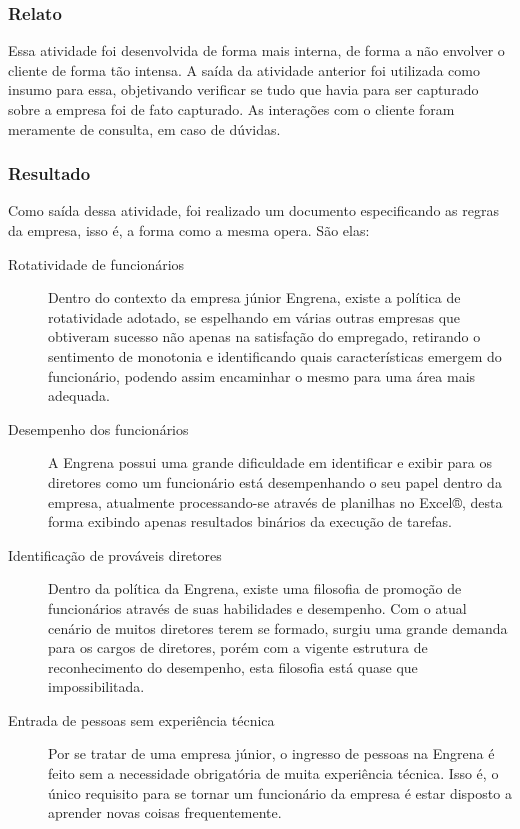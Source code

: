 \subsubsection{Relato}
  Essa atividade foi desenvolvida de forma mais interna, de forma a não envolver o cliente de forma tão intensa. A saída da atividade anterior foi utilizada como insumo para essa, objetivando verificar se tudo que havia para ser capturado sobre a empresa foi de fato capturado. As interações com o cliente foram meramente de consulta, em caso de dúvidas.

  \subsubsection{Resultado}
    Como saída dessa atividade, foi realizado um documento especificando as regras da empresa, isso é, a forma como a mesma opera. São elas:

    \begin{description}
    \item [Rotatividade de funcionários] Dentro do contexto da empresa júnior Engrena, existe a política de rotatividade adotado, se espelhando em várias outras empresas que obtiveram sucesso não apenas na satisfação do empregado, retirando o sentimento de monotonia e identificando quais características emergem do funcionário, podendo assim encaminhar o mesmo para uma área mais adequada.

    \item [Desempenho dos funcionários] A Engrena possui uma grande dificuldade em identificar e exibir para os diretores como um funcionário está desempenhando o seu papel dentro da empresa, atualmente processando-se através de planilhas no Excel®, desta forma exibindo apenas resultados binários da execução de tarefas.

    \item [Identificação de prováveis diretores] Dentro da política da Engrena, existe uma filosofia de promoção de funcionários através de suas habilidades e desempenho. Com o atual cenário de muitos diretores terem se formado, surgiu uma grande demanda para os cargos de diretores, porém com a vigente estrutura de reconhecimento do desempenho, esta filosofia está quase que impossibilitada.

    \item [Entrada de pessoas sem experiência técnica] Por se tratar de uma empresa júnior, o ingresso de pessoas na Engrena é feito sem a necessidade obrigatória de muita experiência técnica. Isso é, o único requisito para se tornar um funcionário da empresa é estar disposto a aprender novas coisas frequentemente.

    \end{description}


